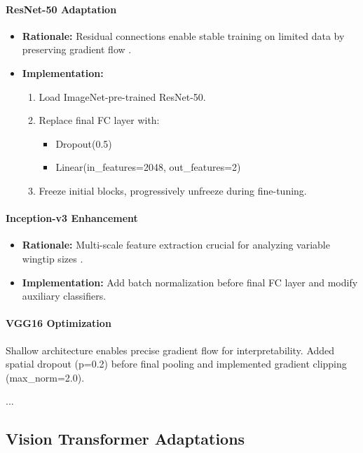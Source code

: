 \paragraph{ResNet-50 Adaptation}
\begin{itemize}
    \item \textbf{Rationale:} Residual connections enable stable training on limited data by preserving gradient flow \cite{source13, source18}.
    \item \textbf{Implementation:}
    \begin{enumerate}
        \item Load ImageNet-pre-trained ResNet-50.
        \item Replace final FC layer with:
        \begin{itemize}
            \item Dropout(0.5)
            \item Linear(in\_features=2048, out\_features=2)
        \end{itemize}
        \item Freeze initial blocks, progressively unfreeze during fine-tuning.
    \end{enumerate}
\end{itemize}

\paragraph{Inception-v3 Enhancement}
\begin{itemize}
    \item \textbf{Rationale:} Multi-scale feature extraction crucial for analyzing variable wingtip sizes \cite{source3, source11}.
    \item \textbf{Implementation:}
    Add batch normalization before final FC layer and modify auxiliary classifiers.
\end{itemize}

\paragraph{VGG16 Optimization}
Shallow architecture enables precise gradient flow for interpretability. Added spatial dropout (p=0.2) before final pooling and implemented gradient clipping (max\_norm=2.0).

...


\subsection{Vision Transformer Adaptations}

